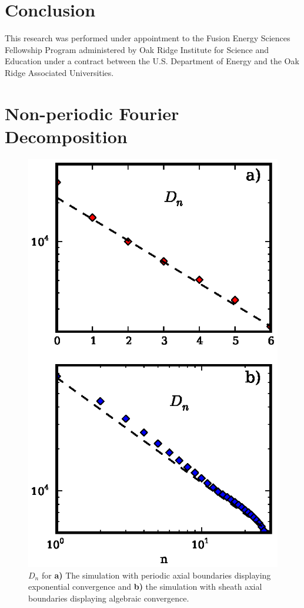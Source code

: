 \documentclass[showpacs,preprintnumbers,amsmath,amssymb,superscriptaddress,aip]{revtex4-1}
\begin{document}
\section{Conclusion}

\begin{acknowledgments}
This research was performed under appointment to the Fusion Energy Sciences Fellowship Program administered by Oak Ridge Institute for
Science and Education under a contract between the U.S. Department of Energy and the Oak Ridge Associated Universities. 
\end{acknowledgments}


\appendix


\section{Non-periodic Fourier Decomposition}

\begin{figure}[!htbp]
\includegraphics[]{fourier_convergence}
\hfil
\caption{$D_n$ for \textbf{a)} The simulation with periodic axial
boundaries displaying exponential convergence and \textbf{b)} the simulation with sheath axial boundaries displaying algebraic convergence.}
\label{fourier_convergence}
\end{figure}
\end{document}
